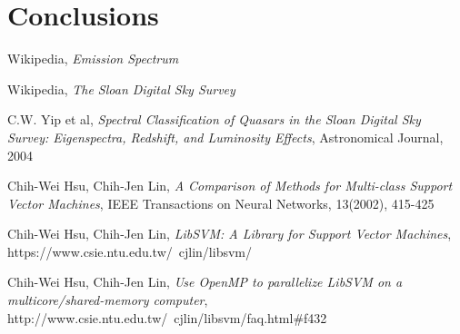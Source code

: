 \documentclass[a4paper,10pt]{article}
\begin{document}
\newpage

\section{Conclusions}

\newpage

\begin{thebibliography}{9}
    Wikipedia,
    \emph{Emission Spectrum}
    
    Wikipedia,
    \emph{The Sloan Digital Sky Survey}
    
    C.W. Yip et al,
    \emph{Spectral Classification of Quasars in the Sloan Digital Sky Survey: Eigenspectra, Redshift, and Luminosity Effects},
    Astronomical Journal,
    2004
    
    Chih-Wei Hsu, Chih-Jen Lin,
    \emph{A Comparison of Methods for Multi-class Support Vector Machines},
    IEEE Transactions on Neural Networks, 13(2002), 415-425
    
    Chih-Wei Hsu, Chih-Jen Lin,
    \emph{LibSVM: A Library for Support Vector Machines},
    https://www.csie.ntu.edu.tw/~cjlin/libsvm/
    
    Chih-Wei Hsu, Chih-Jen Lin,
    \emph{Use OpenMP to parallelize LibSVM on a multicore/shared-memory computer},
    http://www.csie.ntu.edu.tw/~cjlin/libsvm/faq.html\#f432
\end{thebibliography}
\end{document}
